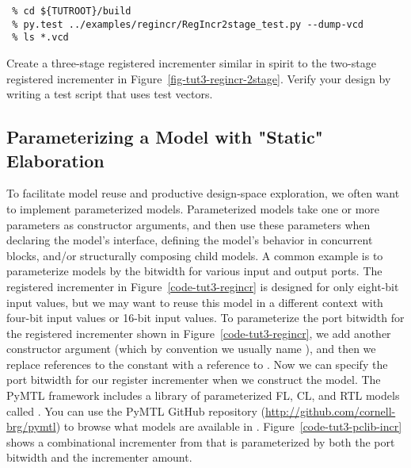 \documentclass{cbxdoc}
\begin{document}
\begin{verbatim}
 % cd ${TUTROOT}/build
 % py.test ../examples/regincr/RegIncr2stage_test.py --dump-vcd
 % ls *.vcd
\end{verbatim}

\begin{task}
  Create a three-stage registered incrementer similar in spirit to the
  two-stage registered incrementer in
  Figure~\ref{fig-tut3-regincr-2stage}. Verify your design by writing a
  test script that uses test vectors.
\end{task}

\subsection{Parameterizing a Model with "Static" Elaboration}

To facilitate model reuse and productive design-space exploration, we
often want to implement parameterized models. Parameterized models take
one or more parameters as constructor arguments, and then use these
parameters when declaring the model's interface, defining the model's
behavior in concurrent blocks, and/or structurally composing child
models. A common example is to parameterize models by the bitwidth for
various input and output ports. The registered incrementer in
Figure~\ref{code-tut3-regincr} is designed for only eight-bit input
values, but we may want to reuse this model in a different context with
four-bit input values or 16-bit input values. To parameterize the port
bitwidth for the registered incrementer shown in
Figure~\ref{code-tut3-regincr}, we add another constructor argument
(which by convention we usually name ), and then we replace
references to the constant  with a reference to . Now we
can specify the port bitwidth for our register incrementer when we
construct the model. The PyMTL framework includes a library of
parameterized FL, CL, and RTL models called . You can use the
PyMTL GitHub repository (\url{http://github.com/cornell-brg/pymtl}) to
browse what models are available in .
Figure~\ref{code-tut3-pclib-incr} shows a combinational incrementer from
 that is parameterized by both the port bitwidth and the
incrementer amount.

\begin{figure}
  \vspace{-0.15in}
  

  \vspace{0.1in}
  
\end{figure}
\end{document}
